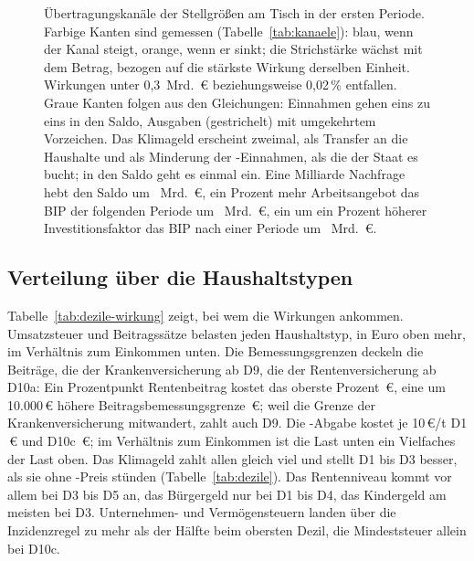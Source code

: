 \begin{figure}[tbp]
\caption{Übertragungskanäle der Stellgrößen am Tisch in der ersten Periode.
Farbige Kanten sind gemessen (Tabelle~\ref{tab:kanaele}): blau, wenn der Kanal
steigt, orange, wenn er sinkt; die Strichstärke wächst mit dem Betrag, bezogen
auf die stärkste Wirkung derselben Einheit. Wirkungen unter 0,3~Mrd.~\euro{}
beziehungsweise 0,02\,\% entfallen. Graue Kanten folgen aus den Gleichungen:
Einnahmen gehen eins zu eins in den Saldo, Ausgaben (gestrichelt) mit
umgekehrtem Vorzeichen. Das Klimageld erscheint zweimal, als Transfer an die
Haushalte und als Minderung der \COz-Einnahmen, als die der Staat es bucht; in
den Saldo geht es einmal ein. Eine Milliarde Nachfrage hebt den Saldo um
\Wstabil~Mrd.~\euro, ein Prozent mehr Arbeitsangebot das BIP der folgenden
Periode um \Warbeit~Mrd.~\euro, ein um ein Prozent höherer Investitionsfaktor
das BIP nach einer Periode um \Winvestn~Mrd.~\euro.}
\label{fig:uebersicht}
\end{figure}

\subsection{Verteilung über die Haushaltstypen}

Tabelle~\ref{tab:dezile-wirkung} zeigt, bei wem die Wirkungen ankommen.
Umsatzsteuer und Beitragssätze belasten jeden Haushaltstyp, in Euro oben mehr,
im Verhältnis zum Einkommen unten. Die Bemessungsgrenzen deckeln die Beiträge,
die der Krankenversicherung ab D9, die der Rentenversicherung ab D10a: Ein
Prozentpunkt Rentenbeitrag kostet das oberste Prozent \,\euro,
eine um 10.000\,\euro{} höhere Beitragsbemessungsgrenze
\,\euro; weil die Grenze der Krankenversicherung mitwandert,
zahlt auch D9. Die \COz-Abgabe kostet je 10\,\euro/t D1 \,\euro{}
und D10c \,\euro; im Verhältnis zum Einkommen ist die Last
unten ein Vielfaches der Last oben. Das Klimageld zahlt allen gleich viel und
stellt D1 bis D3 besser, als sie ohne \COz-Preis stünden
(Tabelle~\ref{tab:dezile}). Das Rentenniveau kommt vor allem bei D3 bis D5 an,
das Bürgergeld nur bei D1 bis D4, das Kindergeld am meisten bei D3. Unternehmen-
und Vermögensteuern landen über die Inzidenzregel zu mehr als der Hälfte beim
obersten Dezil, die Mindeststeuer allein bei D10c.

\begin{table}[tbp]
\centering\footnotesize
\setlength{\tabcolsep}{2.25pt}
\caption{Änderung des verfügbaren Einkommens je Haushalt in der ersten
Periode, \euro{} je Jahr.}
\label{tab:dezile-wirkung}

\end{table}

